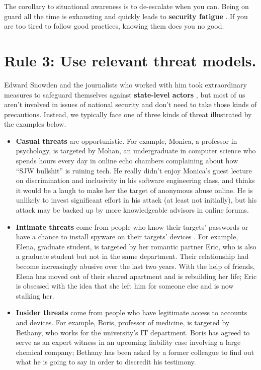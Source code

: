 \documentclass[10pt,letterpaper]{article}
\begin{document}
The corollary to situational awareness is to de-escalate when you can.
Being on guard all the time is exhausting
and quickly leads to \textbf{security fatigue} \cite{Stan2016}.
If you are too tired to follow good practices,
knowing them does you no good.

\section*{Rule 3: Use relevant threat models.}

Edward Snowden and the journalists who worked with him took extraordinary measures
to safeguard themselves against \textbf{state-level actors} \cite{Snow2019},
but most of us aren't involved in issues of national security
and don't need to take those kinds of precautions.
Instead,
we typically face one of three kinds of threat illustrated by the examples below.

\begin{itemize}

\item
  \textbf{Casual threats} are opportunistic.
  For example,
  Monica, a professor in psychology, is targeted by Mohan,
  an undergraduate in computer science
  who spends hours every day in online echo chambers complaining about how ``SJW bullshit'' is ruining tech.
  He really didn't enjoy Monica's guest lecture on discrimination and inclusivity in his software engineering class,
  and thinks it would be a laugh to make her the target of anonymous abuse online.
  He is unlikely to invest significant effort in his attack (at least not initially),
  but his attack may be backed up by more knowledgeable advisors in online forums.

\item
  \textbf{Intimate threats} come from people who know their targets' passwords
  or have a chance to install spyware on their targets' devices \cite{Leit2019}.
  For example,
  Elena, graduate student,
  is targeted by her romantic partner Eric,
  who is also a graduate student but not in the same department.
  Their relationship had become increasingly abusive over the last two years.
  With the help of friends,
  Elena has moved out of their shared apartment and is rebuilding her life;
  Eric is obsessed with the idea that she left him for someone else and is now stalking her.

\item
  \textbf{Insider threats} come from people who have legitimate access to accounts and devices.
  For example,
  Boris, professor of medicine,
  is targeted by Bethany, who works for the university's IT department.
  Boris has agreed to serve as an expert witness in an upcoming liability case involving a large chemical company;
  Bethany has been asked by a former colleague to find out what he is going to say in order to discredit his testimony.

\end{itemize}
\end{document}
